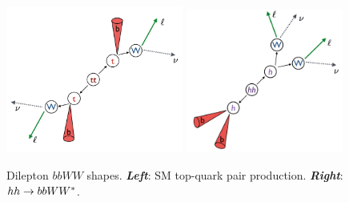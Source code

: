 \begin{figure}[!htb]
    \begin{center}
        \includegraphics[width=0.52\textwidth]{figures/search_hh/signal_pheno/ttbar_topo}
        \includegraphics[width=0.46\textwidth]{figures/search_hh/signal_pheno/hh_topo}
        \caption{
            Dilepton $bbWW$ shapes.
            \textit{\textbf{Left}}: SM top-quark pair production.
            \textit{\textbf{Right}}: $hh \rightarrow bbWW^*$.
        }
        \label{fig:hh_topo}
    \end{center}
\end{figure}

